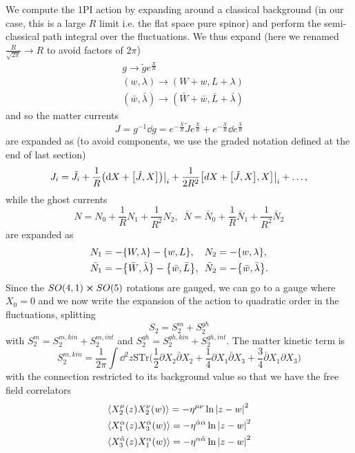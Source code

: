 \documentclass[12pt]{article}
\def\be{\begin{equation}}
\def\ee{\end{equation}}
\numberwithin{equation}{section}
\newcommand{\h}[1]{\hat{#1}}
\begin{document}
We compute the 1PI action by expanding around a classical background (in our case, this is a large $R$ limit i.e. the flat space pure spinor) and perform the semi-classical path integral over the fluctuations. We thus expand (here we renamed $\frac{R}{\sqrt{2\pi}} \to R$ to avoid factors of $2\pi$)
\begin{align}
	&g \to \tilde{g} e^{\frac{X}{R}} \\
	&(w, \lambda) \to (W + w, L + \lambda) \\
	& (\bar{w}, \bar{\lambda}) \to (\bar{W} + \bar{w}, \bar{L} + \bar{\lambda})
\end{align}
and so the matter currents
\be
J = g^{-1} \dd g = e^{-\frac{X}{R}} \tilde{J} e^{\frac{X}{R}} + e^{-\frac{X}{R}} \dd e^{\frac{X}{R}}
\ee
are expanded as (to avoid components, we use the graded notation defined at the end of last section)
\be
J_i = \tilde{J}_i + \frac{1}{R}\big(\dd X  + \comm{\tilde{J}}{X}\big) \big\rvert_i + \frac{1}{2R^2} \comm{dX + \comm{\tilde{J}}{X}}{X} \big\rvert_i + \ldots,
\ee
while the ghost currents
\be
N = N_0 + \frac{1}{R} N_1 + \frac{1}{R^2} N_2, \,\,\, \bar{N} = \bar{N}_0 + \frac{1}{R} \bar{N}_1 + \frac{1}{R^2} \bar{N}_2
\ee
are expanded as
\be
\begin{aligned}
	&N_1 = -\acomm{W}{\lambda} - \acomm{w}{L}, \,\,\,\,\,\, N_2 = -\acomm{w}{\lambda}, \\
	&\bar{N}_1 = -\acomm{\bar{W}}{\bar{\lambda}} - \acomm{\bar{w}}{\bar{L}}, \,\,\, \bar{N}_2 = -\acomm{\bar{w}}{\bar{\lambda}}.
\end{aligned}
\ee
Since the $SO(4,1) \cross SO(5)$ rotations are gauged, we can go to a gauge where $X_0 = 0$ and we now write the expansion of the action to quadratic order in the fluctuations, splitting
\be
S_2 = S_2^m + S_2^{gh}
\ee
with $S_2^m = S_2^{m, kin} + S_2^{m, int}$ and $S_2^{gh} = S_2^{gh, kin} + S_2^{gh, int}$.
The matter kinetic term is
\be
S_2^{m, kin} = \frac{1}{2\pi} \int \dd^2 z \text{STr} \big(\frac{1}{2} \partial X_2 \bar{\partial} X_2 + \frac{1}{4} \partial X_1 \bar{\partial} X_3 + \frac{3}{4} \bar{\partial} X_1 \partial X_3\big)
\ee
with the connection restricted to its background value so that we have the free field correlators
\begin{align}
	&\langle X_2^\mu(z) X_2^\nu(w) \rangle = -\eta^{\mu \nu} \ln \abs{z-w}^2 \\
	& \langle X_1^{\alpha}(z) X_3^{\h{\alpha}}(w) \rangle = -\eta^{ \h{\alpha} \alpha} \ln \abs{z-w}^2 \\
	& \langle X_3^{\h{\alpha}}(z) X_1^\alpha(w) \rangle = -\eta^{\alpha\h{\alpha}} \ln \abs{z-w}^2
\end{align}
\end{document}

